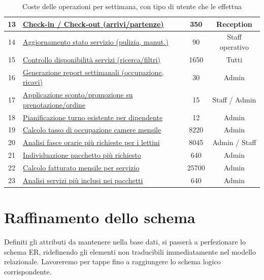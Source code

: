 \documentclass[a4paper,12pt]{report}
\begin{document}
\begin{table}[H]
\begin{tabularx}{\textwidth}{|c|>{\raggedright\arraybackslash}X|c|c|}
		\hline
		13          & \hyperref[op13]{Check-in / Check-out (arrivi/partenze)}                & 350                       & Reception              \\
		\hline
		14          & \hyperref[op14]{Aggiornamento stato servizio (pulizia, manut.)}        & 90                        & Staff operativo        \\
		\hline
		15          & \hyperref[op15]{Controllo disponibilità servizi (ricerca/filtri)}      & 1650                      & Tutti                  \\
		\hline
		16          & \hyperref[op16]{Generazione report settimanali (occupazione, ricavi)}  & 30                        & Admin                  \\
		\hline
		17          & \hyperref[op17]{Applicazione sconto/promozione su prenotazione/ordine} & 15                        & Staff / Admin          \\
		\hline
		18          & \hyperref[op18]{Pianificazione turno esistente per dipendente}  & 12                         & Admin                  \\
		\hline
		19          & \hyperref[op19]{Calcolo tasso di occupazione camere mensile}           & 8220                      & Admin                  \\
		\hline
		20          & \hyperref[op20]{Analisi fasce orarie più richieste per i lettini}      & 8045                      & Admin / Staff          \\
		\hline
		21          & \hyperref[op21]{Individuazione pacchetto più richiesto}                & 640                       & Admin                  \\
		\hline
		22          & \hyperref[op22]{Calcolo fatturato mensile per servizio}                & 25700                     & Admin                  \\
		\hline
		23          & \hyperref[op23]{Analisi servizi più inclusi nei pacchetti}             & 640                       & Admin                  \\
		\hline
	\end{tabularx}
	\caption{Coste delle operazioni per settimana, con tipo di utente che le effettua}
	\label{tab:costo-operazioni-settimanali}
\end{table}

\newpage
\section{Raffinamento dello schema}
Definiti gli attributi da mantenere nella base dati, si passerà a perfezionare lo schema ER, ridefinendo gli elementi non
traducibili immediatamente nel modello relazionale. Lavoreremo per tappe fino a raggiungere lo schema logico corrispondente.
\end{document}
